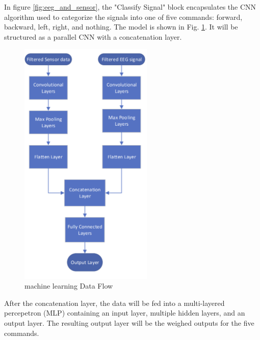 \documentclass[conference]{IEEEtran}
\begin{document}
        In figure \ref{fig:eeg_and_sensor}, the "Classify Signal" block encapsulates the CNN algorithm used to categorize the signals into one of five commands: forward, backward, left, right, and nothing. The model is shown in Fig. \ref{fig:ml-flow}. It will be structured as a parallel CNN with a concatenation layer. 

         \begin{figure}[htbp]
            \centering
            \includegraphics[height=4.7in, keepaspectratio]{figs/ml-flow.png}
            \caption{machine learning Data Flow}
            \label{fig:ml-flow}
        \end{figure}

        After the concatenation layer, the data will be fed into a multi-layered percepetron (MLP) containing an input layer, multiple hidden layers, and an output layer. The resulting output layer will be the weighed outputs for the five commands. 
\end{document}
